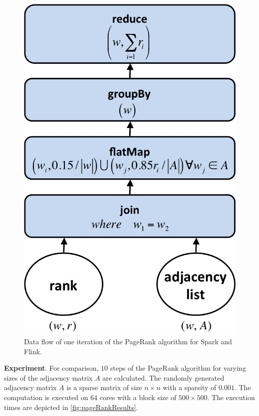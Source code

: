 \begin{figure}[htbp]
	\centering
	\includegraphics[width=.275\linewidth]{images/pageRankStep.png}
	\caption{Data flow of one iteration of the PageRank algorithm for Spark and Flink.}
	\label{fig:pageRankDataFlow}
\end{figure}

\textbf{Experiment}. For comparison, $10$ steps of the PageRank algorithm for varying sizes of the adjacency matrix $A$ are calculated.
The randomly generated adjacency matrix $A$ is a sparse matrix of size $n \times n$ with a sparsity of $0.001$.
The computation is executed on $64$ cores with a block size of $500 \times 500$.
The execution times are depicted in \cref{fig:pageRankResults}.

